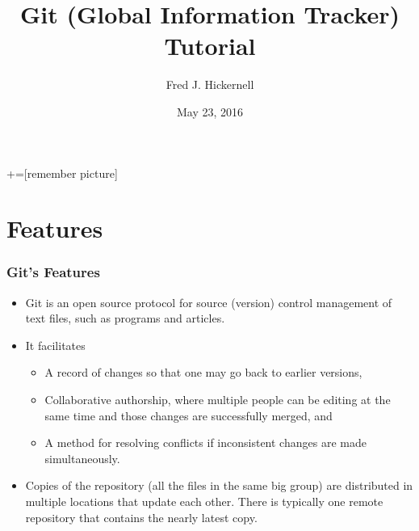 \documentclass[12pt, compress,xcolor={usenames,dvipsnames}]{beamer} %
\begin{document}
	+=[remember picture]
	\everymath{\displaystyle}
	
	\title[Illinois Institute of Technology]{Git (Global Information Tracker) Tutorial}
	\author[Fred J. Hickernell]{Fred J. Hickernell}
	\date[May 23, 2016]{May 23, 2016}
	\frame[label=title]{\titlepage}
	
	
\section{Features}
	\begin{frame}\frametitle{Git's Features}
		
		\vspace{-3ex}
		
		\begin{itemize}
						
			\item Git is an open source protocol for \alert{source (version) control management} of text files, such as programs and articles.
			
			\item It facilitates
			
			\begin{itemize}
				\item A \alert{record of changes} so that one may go back to earlier versions,
				
				\item \alert{Collaborative} authorship, where multiple people can be editing at the same time and those changes are successfully merged, and
				
				\item A method for \alert{resolving conflicts} if inconsistent changes are made simultaneously.
			\end{itemize}
			
			\item Copies of the repository (all the files in the same big group) are \alert{distributed} in multiple locations that update each other.  There is typically one remote repository that contains the nearly latest copy.
			 
			
		\end{itemize}
		
	\end{frame}
	
\end{document}
